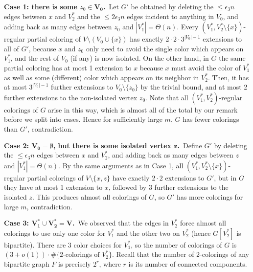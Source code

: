 \documentclass[11pt]{article}
\begin{document}
\textbf{Case 1: there is some $z_0 \in \boldsymbol{V_0}$.}\, Let $G'$
be obtained by deleting the $\leq \epsilon_3 n$ edges between $x$ and
$V_2^*$ and the $\leq 2 \epsilon_3 n$ edges incident to anything in
$V_0$, and adding back as many edges between $z_0$ and $|V_1^*| =
\Theta(n)$.  Every $(V_1^*, V_2^* \setminus \{x\})$-regular partial
coloring of $V \setminus (V_0 \cup \{x\})$ has exactly $2 \cdot 2
\cdot 3^{|V_0|-1}$ extensions to all of $G'$, because $x$ and $z_0$
only need to avoid the single color which appears on $V_1^*$, and the
rest of $V_0$ (if any) is now isolated.  On the other hand, in $G$ the
same partial coloring has at most 1 extension to $x$ because $x$ must
avoid the color of $V_1^*$ as well as some (different) color which
appears on its neighbor in $V_2^*$.  Then, it has at most
$3^{|V_0|-1}$ further extensions to $V_0 \setminus \{z_0\}$ by the
trivial bound, and at most 2 further extensions to the non-isolated
vertex $z_0$.  Note that all $(V_1^*, V_2^*)$-regular colorings of $G$
arise in this way, which is almost all of the total by our remark
before we split into cases.  Hence for sufficiently large $m$, $G$ has
fewer colorings than $G'$, contradiction.

\vspace{2mm}

\textbf{Case 2: $\boldsymbol{V_0} = \emptyset$, but there is some
  isolated vertex $\boldsymbol{z}$.}\, Define $G'$ by deleting the
$\leq \epsilon_3 n$ edges between $x$ and $V_2^*$, and adding back as
many edges between $z$ and $|V_1^*| = \Theta(n)$.  By the same
arguments as in Case 1, all $(V_1^*, V_2^* \setminus \{x\})$-regular
partial colorings of $V \setminus \{x,z\}$ have exactly $2 \cdot 2$
extensions to $G'$, but in $G$ they have at most 1 extension to $x$,
followed by 3 further extensions to the isolated $z$.  This produces
almost all colorings of $G$, so $G'$ has more colorings for large $m$,
contradiction.

\vspace{2mm}

\textbf{Case 3: $\boldsymbol{V_1^* \cup V_2^* = V}$.}\, We observed
that the edges in $V_2^*$ force almost all colorings to use only one
color for $V_1^*$ and the other two on $V_2^*$ (hence $G[V_2^*]$ is
bipartite).  There are 3 color choices for $V_1^*$, so the number of
colorings of $G$ is $(3+o(1)) \cdot \#\{\text{2-colorings of
  $V_2^*$}\}$.  Recall that the number of 2-colorings of any bipartite
graph $F$ is precisely $2^r$, where $r$ is its number of connected
components.
\end{document}
